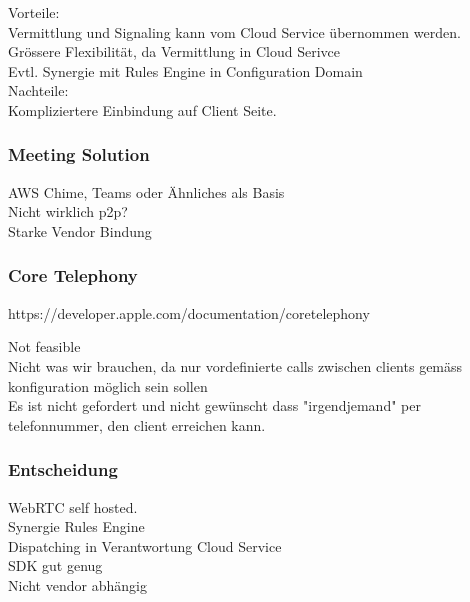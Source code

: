 Vorteile: \\

Vermittlung und Signaling kann vom Cloud Service übernommen werden. \\
Grössere Flexibilität, da Vermittlung in Cloud Serivce \\
Evtl. Synergie mit Rules Engine in Configuration Domain \\

Nachteile: \\

Kompliziertere Einbindung auf Client Seite.


\subsubsection{Meeting Solution}

AWS Chime, Teams oder Ähnliches als Basis \\
Nicht wirklich p2p? \\
Starke Vendor Bindung \\



\subsubsection*{Core Telephony}

https://developer.apple.com/documentation/coretelephony

Not feasible \\
Nicht was wir brauchen, da nur vordefinierte calls zwischen clients gemäss konfiguration möglich sein sollen \\
Es ist nicht gefordert und nicht gewünscht dass "irgendjemand" per telefonnummer, den client erreichen kann. \\


\subsubsection{Entscheidung}

WebRTC self hosted. \\

Synergie Rules Engine \\
Dispatching in Verantwortung Cloud Service \\
SDK gut genug \\
Nicht vendor abhängig \\


\clearpage
